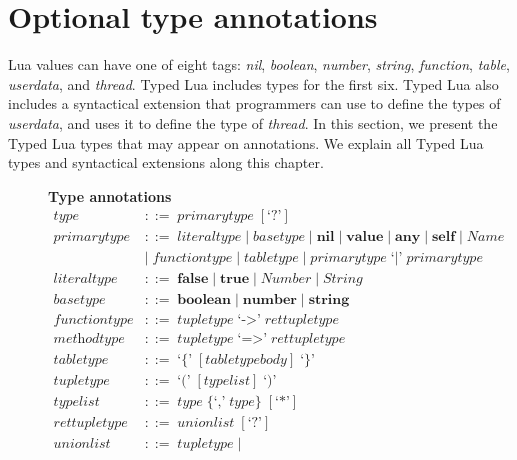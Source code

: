\section{Optional type annotations}

Lua values can have one of eight tags:
\emph{nil}, \emph{boolean}, \emph{number}, \emph{string},
\emph{function}, \emph{table}, \emph{userdata}, and \emph{thread}.
Typed Lua includes types for the first six.
Typed Lua also includes a syntactical extension that programmers can use
to define the types of \emph{userdata}, and uses it to define the type of \emph{thread}. 
In this section, we present the Typed Lua types that may appear on annotations.
We explain all Typed Lua types and syntactical extensions along this chapter.

\begin{figure}[!ht]
\textbf{Type annotations}\\
\dstart
\begin{align*}
\textit{type} & ::= \; \textit{primarytype} \; [\texttt{`?'}]\\
\textit{primarytype} & ::= \; \textit{literaltype} \; | \;
  \textit{basetype} \; | \;
  \textbf{nil} \; | \;
  \textbf{value} \; | \;
  \textbf{any} \; | \;
  \textbf{self} \; | \;
  \textit{Name}\\
& | \; \textit{functiontype} \; | \;
  \textit{tabletype} \; | \;
  \textit{primarytype} \; \texttt{`|'} \; \textit{primarytype}\\
\textit{literaltype} & ::= \; \textbf{false} \; | \;
  \textbf{true} \; | \;
  \textit{Number} \; | \;
  \textit{String}\\
\textit{basetype} & ::= \; \textbf{boolean} \; | \;
  \textbf{number} \; | \;
  \textbf{string}\\
\textit{functiontype} & ::= \; \textit{tupletype} \; \texttt{`->'} \; \textit{rettupletype}\\
\textit{methodtype} & ::= \; \textit{tupletype} \; \texttt{`=>'} \; \textit{rettupletype}\\
\textit{tabletype} & ::= \; \texttt{`\{'} \; [\textit{tabletypebody}] \; \texttt{`\}'}\\
\textit{tupletype} & ::= \; \texttt{`('} \; [typelist] \; \texttt{`)'}\\
\textit{typelist} & ::= \; \textit{type} \; \{\texttt{`,'} \; \textit{type}\} \; [\texttt{`*'}]\\
\textit{rettupletype} & ::= \; \textit{unionlist} \; [\texttt{`?'}]\\
\textit{unionlist} & ::= \; \textit{tupletype} \; | \;

\end{align*}
\end{figure}
